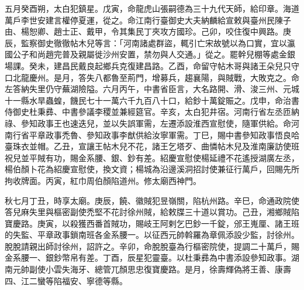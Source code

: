 \begin{pinyinscope}
 五月癸酉朔，太白犯鎮星。戊寅，命龍虎山張嗣德為三十九代天師，給印章。海道萬戶李世安建言權停夏運，從之。命江南行臺御史大夫納麟給宣敕與臺州民陳子由、楊恕卿、趙士正、戴甲，令其集民丁夾攻方國珍。己卯，咬住復中興路。庚辰，監察御史徹徹帖木兒等言：「河南諸處群盜，輒引亡宋故號以為口實，宜以瀛國公子和尚趙完普及親屬徙沙州安置，禁勿與人交通。」從之。罷幹兒棚等處金銀場課。癸未，建昌民戴良起鄉兵克復建昌路。乙酉，命留守帖木哥與諸王朵兒只守口北龍慶州。是月，答失八都魯至荊門，增募兵，趨襄陽，與賊戰，大敗克之。命左答納失里仍守蕪湖險隘。六月丙午，中書省臣言，大名路開、滑、浚三州、元城十一縣水旱蟲蝗，饑民七十一萬六千九百八十口，給鈔十萬錠賑之。戊申，命治書侍御史杜秉彞、中書參議李稷並兼經筵官。辛亥，太白犯井宿。河南行省左丞匝納祿、參知政事王也速迭兒，並以失誤軍需，左遷添設淮西宣慰使，隨軍供給。命河南行省平章政事禿魯、參知政事李猷供給汝寧軍需。丁巳，賜中書參知政事悟良哈臺珠衣並帽。乙丑，宣讓王帖木兒不花，諸王乞塔歹、曲憐帖木兒及淮南廉訪使班祝兒並平賊有功，賜金系腰、銀、鈔有差。紹慶宣慰使楊延禮不花遙授湖廣左丞，楊伯顏卜花為紹慶宣慰使，換文資；楊城為沿邊溪洞招討使兼征行萬戶，回賜先所拘收牌面。丙寅，紅巾周伯顏陷道州。修太廟西神門。



 秋七月丁丑，時享太廟。庚辰，饒、徽賊犯昱嶺關，陷杭州路。辛巳，命通政院使答兒麻失里與樞密副使禿堅不花討徐州賊，給敕牒三十道以賞功。己丑，湘鄉賊陷寶慶路。庚寅，以殺獲西番首賊功，賜岐王阿剌乞巴鈔一千錠，邠王嵬厘、諸王班的失監、平章政事鎖南班各金系腰一。以征西元帥斡羅為章佩添設少監，討徐州。脫脫請親出師討徐州，詔許之。辛卯，命脫脫臺為行樞密院使，提調二十萬戶，賜金系腰一、銀鈔幣帛有差。丁酉，辰星犯靈臺。以杜秉彞為中書添設參知政事。湖南元帥副使小雲失海牙、總管兀顏思忠復寶慶路。是月，徐壽輝偽將王善、康壽四、江二蠻等陷福安、寧德等縣。




\end{pinyinscope}
